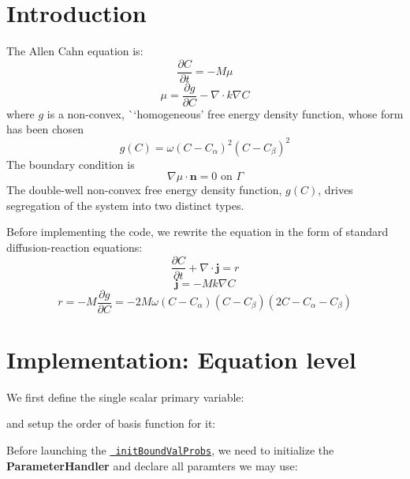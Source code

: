 \hypertarget{growth_Introduction}{}\section{Introduction}\label{growth_Introduction}
The Allen Cahn equation is\+: \[ \frac{\partial C}{\partial t}=-M\mu \] \[ \mu=\frac{\partial g}{\partial C}-\nabla\cdot k\nabla C \] where $g$ is a non-\/convex, \`{}`homogeneous'\textquotesingle{} free energy density function, whose form has been chosen \[ g(C)=\omega(C-C_\alpha)^2(C-C_\beta)^2 \] The boundary condition is \[ \nabla \mu\cdot\boldsymbol{n}=0 \text{ on }\Gamma \] The double-\/well non-\/convex free energy density function, $g(C)$, drives segregation of the system into two distinct types.

Before implementing the code, we rewrite the equation in the form of standard diffusion-\/reaction equations\+: \[ \frac{\partial C}{\partial t}+\nabla\cdot\boldsymbol{j}=r \] \[ \boldsymbol{j}=-Mk\nabla C \] \[ r=-M\frac{\partial g}{\partial C}=-2M\omega(C-C_\alpha)(C-C_\beta)(2C-C_\alpha-C_\beta) \]\hypertarget{growth_imple}{}\section{Implementation\+: Equation level}\label{growth_imple}
We first define the single scalar primary variable\+: 
\begin{DoxyCode}{0}
\end{DoxyCode}
 and setup the order of basis function for it\+: 
\begin{DoxyCode}{0}
\end{DoxyCode}
 Before launching the \href{../html/classinit_bound_val_probs.html}{\texttt{ init\+Bound\+Val\+Probs}}, we need to initialize the {\bfseries{Parameter\+Handler}} and declare all paramters we may use\+: 
\begin{DoxyCode}{0}
\DoxyCodeLine{\textcolor{comment}{//... more parameters }}
\end{DoxyCode}

